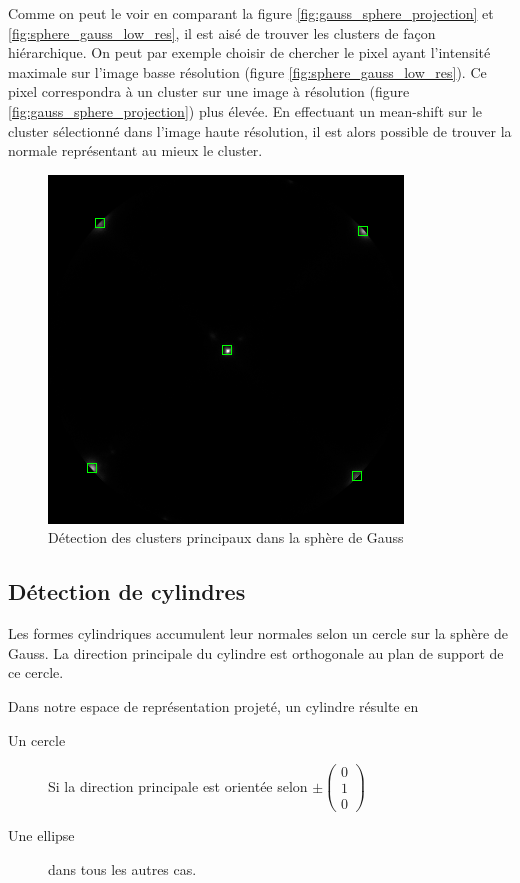\documentclass{article}
\begin{document}
Comme on peut le voir en comparant la figure \ref{fig:gauss_sphere_projection} et \ref{fig:sphere_gauss_low_res}, il est aisé de trouver les clusters de façon hiérarchique. On peut par exemple choisir de chercher le pixel ayant l'intensité maximale sur l'image basse résolution (figure \ref{fig:sphere_gauss_low_res}). Ce pixel correspondra à un cluster sur une image à résolution (figure \ref{fig:gauss_sphere_projection}) plus élevée. En effectuant un mean-shift sur le cluster sélectionné dans l'image haute résolution, il est alors possible de trouver la normale représentant au mieux le cluster.

\begin{figure}[H]
\centering
\includegraphics[width=.5\columnwidth]{../blob.png}
\caption{Détection des clusters principaux dans la sphère de Gauss}
\label{fig:clusters_gauss}
\end{figure}


\subsection{Détection de cylindres}
Les formes cylindriques accumulent leur normales selon un cercle sur la sphère de Gauss. La direction principale du cylindre est orthogonale au plan de support de ce cercle.

Dans notre espace de représentation projeté, un cylindre résulte en
\begin{description}
\item[Un cercle] Si la direction principale est orientée selon $\pm \left(\begin{array}{l}0\\1\\0\end{array}\right)$
\item[Une ellipse] dans tous les autres cas.
\end{description}
\end{document}
